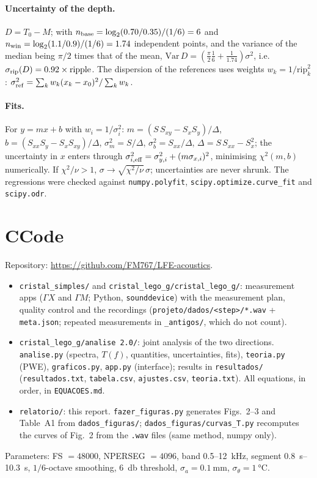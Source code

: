 \documentclass[9pt,a4paper,twocolumn]{extarticle}
\newcommand{\umm}{\milli\metre}
\newcommand{\ukHz}{\kilo\hertz}
\newcommand{\udB}{\decibel}
\newcommand{\us}{\second}
\newcommand{\GX}{\ensuremath{\Gamma X}}
\newcommand{\GM}{\ensuremath{\Gamma M}}
\begin{document}
\paragraph{Uncertainty of the depth.} $D=T_0-M$; with $n_{\rm base}=\log_2(0.70/0.35)/(1/6)=6$ and $n_{\rm win}=\log_2(1.1/0.9)/(1/6)=1.74$ independent points, and the variance of the median being $\pi/2$ times that of the mean, $\mathrm{Var}\,D=\left(\frac\pi2\frac16+\frac1{1.74}\right)\sigma^2$, i.e.\ $\sigma_{\rm rip}(D)=0.92\times\mathrm{ripple}$. The dispersion of the references uses weights $w_k=1/\mathrm{rip}_k^2$: $\sigma_{\rm ref}^2=\sum_kw_k(x_k-x_0)^2/\sum_kw_k$.

\paragraph{Fits.} For $y=mx+b$ with $w_i=1/\sigma_i^2$: $m=(S\,S_{xy}-S_xS_y)/\Delta$, $b=(S_{xx}S_y-S_xS_{xy})/\Delta$, $\sigma_m^2=S/\Delta$, $\sigma_b^2=S_{xx}/\Delta$, $\Delta=S\,S_{xx}-S_x^2$; the uncertainty in $x$ enters through $\sigma_{i,\rm eff}^2=\sigma_{y,i}^2+(m\sigma_{x,i})^2$, minimising $\chi^2(m,b)$ numerically. If $\chi^2/\nu>1$, $\sigma\to\sqrt{\chi^2/\nu}\,\sigma$; uncertainties are never shrunk. The regressions were checked against \texttt{numpy.polyfit}, \texttt{scipy.optimize.curve\_fit} and \texttt{scipy.odr}.

\section*{C\quad Code}
Repository: \url{https://github.com/FM767/LFE-acoustics}.
\begin{itemize}\setlength{\itemsep}{0pt}
\item \texttt{cristal\_simples/} and \texttt{cristal\_lego\_g/cristal\_lego\_g/}: measurement apps (\GX{} and \GM; Python, \texttt{sounddevice}) with the measurement plan, quality control and the recordings (\texttt{projeto/dados/<step>/*.wav} + \texttt{meta.json}; repeated measurements in \texttt{\_antigos/}, which do not count).
\item \texttt{cristal\_lego\_g/analise 2.0/}: joint analysis of the two directions. \texttt{analise.py} (spectra, $T(f)$, quantities, uncertainties, fits), \texttt{teoria.py} (PWE), \texttt{graficos.py}, \texttt{app.py} (interface); results in \texttt{resultados/} (\texttt{resultados.txt}, \texttt{tabela.csv}, \texttt{ajustes.csv}, \texttt{teoria.txt}). All equations, in order, in \texttt{EQUACOES.md}.
\item \texttt{relatorio/}: this report. \texttt{fazer\_figuras.py} generates Figs.~2--3 and Table~A1 from \texttt{dados\_figuras/}; \texttt{dados\_figuras/curvas\_T.py} recomputes the curves of Fig.~2 from the \texttt{.wav} files (same method, numpy only).
\end{itemize}
Parameters: FS $=48000$, NPERSEG $=4096$, band 0.5--\SI{12}{\ukHz}, segment \SIrange{0.8}{10.3}{\us}, $1/6$-octave smoothing, \SI{6}{\udB} threshold, $\sigma_a=\SI{0.1}{\umm}$, $\sigma_\theta=\SI{1}{\celsius}$.
\end{document}
